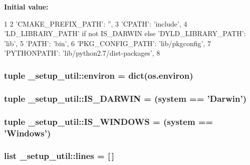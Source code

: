 {\bfseries \-Initial value\-:}
\begin{DoxyCode}
1 {
2     'CMAKE_PREFIX_PATH': '',
3     'CPATH': 'include',
4     'LD_LIBRARY_PATH' if not IS_DARWIN else 'DYLD_LIBRARY_PATH': 'lib',
5     'PATH': 'bin',
6     'PKG_CONFIG_PATH': 'lib/pkgconfig',
7     'PYTHONPATH': 'lib/python2.7/dist-packages',
8 }
\end{DoxyCode}
\hypertarget{namespace__setup__util_a0a3189a3fa13a696964c791ed2a5ea85}{
\subsubsection[{environ}]{\setlength{\rightskip}{0pt plus 5cm}tuple {\bf \-\_\-setup\-\_\-util\-::environ} = dict(os.\-environ)}}\label{namespace__setup__util_a0a3189a3fa13a696964c791ed2a5ea85}
\hypertarget{namespace__setup__util_aecbb100ce6f94bb3c7e16d58fde05f96}{
\subsubsection[{\-I\-S\-\_\-\-D\-A\-R\-W\-I\-N}]{\setlength{\rightskip}{0pt plus 5cm}tuple {\bf \-\_\-setup\-\_\-util\-::\-I\-S\-\_\-\-D\-A\-R\-W\-I\-N} = ({\bf system} == '\-Darwin')}}\label{namespace__setup__util_aecbb100ce6f94bb3c7e16d58fde05f96}
\hypertarget{namespace__setup__util_a6fe69c2dbd92959b6651a28cbb846e6e}{
\subsubsection[{\-I\-S\-\_\-\-W\-I\-N\-D\-O\-W\-S}]{\setlength{\rightskip}{0pt plus 5cm}tuple {\bf \-\_\-setup\-\_\-util\-::\-I\-S\-\_\-\-W\-I\-N\-D\-O\-W\-S} = ({\bf system} == '\-Windows')}}\label{namespace__setup__util_a6fe69c2dbd92959b6651a28cbb846e6e}
\hypertarget{namespace__setup__util_a8618d8be5f729d4c9696daa5e083a001}{
\subsubsection[{lines}]{\setlength{\rightskip}{0pt plus 5cm}list {\bf \-\_\-setup\-\_\-util\-::lines} = \mbox{[}$\,$\mbox{]}}}\label{namespace__setup__util_a8618d8be5f729d4c9696daa5e083a001}
